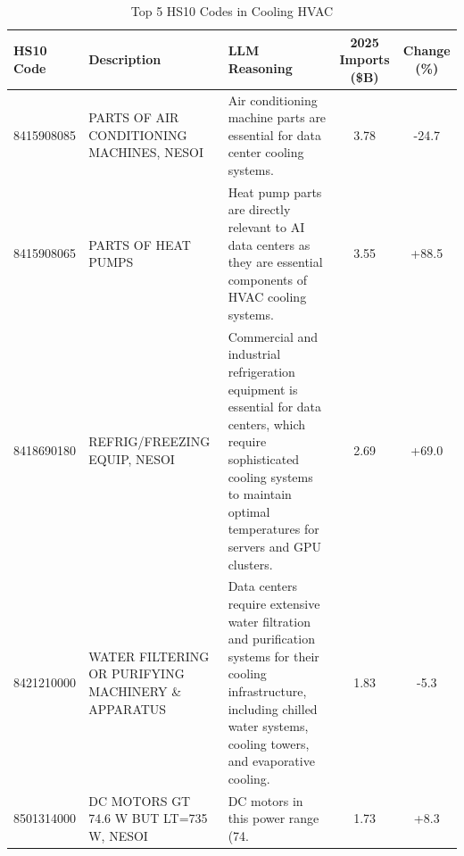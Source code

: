 \begin{table}[htbp]
\centering
\small
\caption{Top 5 HS10 Codes in Cooling HVAC}
\label{tab:top5_cooling_hvac}
\setlength{\tabcolsep}{1.25mm}
\renewcommand{\arraystretch}{1.80}
\begin{tabular}{lp{3.5cm}p{3.5cm}cc}
\toprule
HS10 Code & Description & LLM Reasoning & 2025 Imports (\$B) & Change (\%) \\
\midrule
8415908085 & {\footnotesize PARTS OF AIR CONDITIONING MACHINES, NESOI} & {\footnotesize Air conditioning machine parts are essential for data center cooling systems.} & 3.78 & -24.7 \\
8415908065 & {\footnotesize PARTS OF HEAT PUMPS} & {\footnotesize Heat pump parts are directly relevant to AI data centers as they are essential components of HVAC cooling systems.} & 3.55 & +88.5 \\
8418690180 & {\footnotesize REFRIG/FREEZING EQUIP, NESOI} & {\footnotesize Commercial and industrial refrigeration equipment is essential for data centers, which require sophisticated cooling systems to maintain optimal temperatures for servers and GPU clusters.} & 2.69 & +69.0 \\
8421210000 & {\footnotesize WATER FILTERING OR PURIFYING MACHINERY \& APPARATUS} & {\footnotesize Data centers require extensive water filtration and purification systems for their cooling infrastructure, including chilled water systems, cooling towers, and evaporative cooling.} & 1.83 & -5.3 \\
8501314000 & {\footnotesize DC  MOTORS GT 74.6 W BUT LT=735 W, NESOI} & {\footnotesize DC motors in this power range (74.} & 1.73 & +8.3 \\
\bottomrule
\end{tabular}
\end{table}

